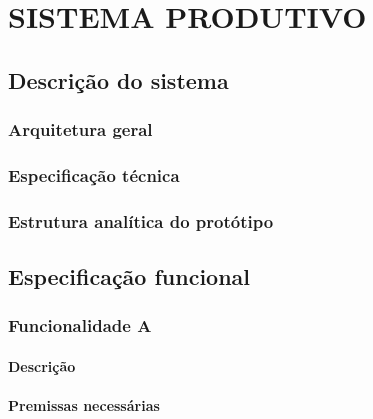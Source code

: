 \chapter{SISTEMA PRODUTIVO}
\label{chap:desenv}


\section{Descrição do sistema}
\label{sec:descsis}

\subsection{Arquitetura geral}
\label{sub:arqg}

\subsection{Especificação técnica}
\label{sub:esptec}

\subsection{Estrutura analítica do protótipo}
\label{sub:eap}



\section{Especificação funcional} %
\label{sec:sota}



\subsection{Funcionalidade A}
\label{sub:funcA}

\subsubsection{Descrição} %
\label{ssub:descA}

\subsubsection{Premissas necessárias}
\label{ssub:premA}


